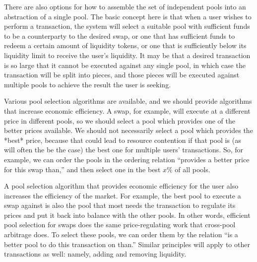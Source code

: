 \documentclass[12pt]{article}
\begin{document}
There are also options for how to assemble the set of independent pools into an abstraction of a single pool. The basic concept here is that when a user wishes to perform a transaction,
the system will select a suitable pool with sufficient funds to be a counterparty to the desired swap, or one that has sufficient funds to redeem a certain amount of
liquidity tokens, or one that is sufficiently below its liquidity limit to receive the user's liquidity.
It may be that a desired transaction is so large that it cannot be executed against any single pool, in which case the transaction will be split into pieces, and those pieces will be executed against multiple pools to achieve the result the user is seeking.

Various pool selection algorithms are available, and we should provide algorithms
that increase economic efficiency. A swap, for example, will execute at a different price in different pools, so we should select a pool which provides one of the better prices available. We should not necessarily select a pool which provides the *best* price, because that could lead to resource contention if that pool is (as will often the be the case) the best one for multiple users' transactions. So, for example, we can order the pools in the ordering relation ``provides a better price for this swap than,''
and then select one in the best $x\%$ of all pools. 

A pool selection algorithm that provides economic efficiency for the user also increases the efficiency of the market. For example, the best pool to execute a swap against is also the pool that most needs the transaction to regulate its prices and put it back into balance with the other pools. In other words, efficient pool selection for swaps does the same price-regulating work that cross-pool arbitrage does. To select these pools, we can order them by the relation ``is a better pool to do this transaction on than.'' Similar principles will apply to other transactions as well: namely, adding and removing liquidity. 
\end{document}
